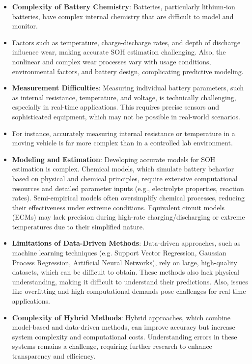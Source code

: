 \begin{itemize}
    \item \textbf{Complexity of Battery Chemistry}: Batteries, particularly lithium-ion batteries, have complex internal chemistry that are difficult to model and monitor.
    \item Factors such as temperature, charge-discharge rates, and depth of discharge influence wear, making accurate SOH estimation challenging. Also, the nonlinear and complex wear processes vary with usage conditions, environmental factors, and battery design, complicating predictive modeling.
    \item \textbf{Measurement Difficulties}: Measuring individual battery parameters, such as internal resistance, temperature, and voltage, is technically challenging, especially in real-time applications.  This requires precise sensors and sophisticated equipment, which may not be possible in real-world scenarios.
    \item For instance, accurately measuring internal resistance or temperature in a moving vehicle is far more complex than in a controlled lab environment.
    \item \textbf{Modeling and Estimation}: Developing accurate models for SOH estimation is complex. Chemical models, which simulate battery behavior based on physical and chemical principles, require extensive computational resources and detailed parameter inputs (e.g., electrolyte properties, reaction rates). Semi-empirical models often oversimplify chemical processes, reducing their effectiveness under extreme conditions. Equivalent circuit models (ECMs) may lack precision during high-rate charging/discharging or extreme temperatures due to their simplified nature.
    \item \textbf{Limitations of Data-Driven Methods}: Data-driven approaches, such as machine learning techniques (e.g. Support Vector Regression, Gaussian Process Regression, Artificial Neural Networks), rely on large, high-quality datasets, which can be difficult to obtain. These methods also lack physical understanding, making it difficult to understand their predictions. Also, issues like overfitting and high computational demands pose challenges for real-time applications.
    \item \textbf{Complexity of Hybrid Methods}: Hybrid approaches, which combine model-based and data-driven methods, can improve accuracy but increase system complexity and computational costs. Understanding errors in these systems remains a challenge, requiring further research to enhance transparency and efficiency.

\end{itemize}
